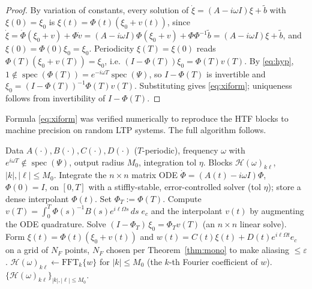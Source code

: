 \documentclass{amsart}
\theoremstyle{definition}
\DeclareMathOperator{\spec}{spec}
\newcommand{\Hcal}{\mathcal{H}}
\begin{document}
\begin{proof}
By variation of constants, every solution of $\dot\xi=(A-i\omega I)\xi+\tilde b$
with $\xi(0)=\xi_0$ is $\xi(t)=\Phi(t)(\xi_0+v(t))$, since
$\dot\xi=\dot\Phi(\xi_0+v)+\Phi\dot v
=(A-i\omega I)\Phi(\xi_0+v)+\Phi\Phi^{-1}\tilde b=(A-i\omega I)\xi+\tilde b$, and
$\xi(0)=\Phi(0)\xi_0=\xi_0$. Periodicity $\xi(T)=\xi(0)$ reads
$\Phi(T)(\xi_0+v(T))=\xi_0$, i.e. $(I-\Phi(T))\xi_0=\Phi(T)v(T)$. By
\eqref{eq:hyp}, $1\notin\spec(\Phi(T))=e^{-i\omega T}\spec(\Psi)$, so $I-\Phi(T)$
is invertible and $\xi_0=(I-\Phi(T))^{-1}\Phi(T)v(T)$. Substituting gives
\eqref{eq:xiform}; uniqueness follows from invertibility of $I-\Phi(T)$.
\end{proof}

Formula \eqref{eq:xiform} was verified numerically to reproduce the HTF blocks
to machine precision on random LTP systems. The full algorithm follows.

\begin{algorithm}[H]
\caption{Monodromy/Floquet HTF at a single frequency $\omega$}\label{alg:mono}
\begin{algorithmic}[1]
\Require Data $A(\cdot),B(\cdot),C(\cdot),D(\cdot)$ ($T$-periodic), frequency $\omega$
with $e^{i\omega T}\notin\spec(\Psi)$, output radius $M_0$, integration tol $\eta$.
\Ensure Blocks $\Hcal(\omega)_{k\ell}$, $|k|,|\ell|\le M_0$.
\State Integrate the $n\times n$ matrix ODE $\dot\Phi=(A(t)-i\omega I)\Phi$,
$\Phi(0)=I$, on $[0,T]$ with a stiffly-stable, error-controlled solver (tol
$\eta$); store a dense interpolant $\Phi(t)$. Set $\Phi_T:=\Phi(T)$.
  \State Compute $v(T)=\int_0^T\Phi(s)^{-1}B(s)e^{i\ell\Omega s}\,ds\;e_c$ and the
  interpolant $v(t)$ by augmenting the ODE quadrature.
  \State Solve $(I-\Phi_T)\,\xi_0=\Phi_T v(T)$ (an $n\times n$ linear solve).
  \State Form $\xi(t)=\Phi(t)(\xi_0+v(t))$ and
  $w(t)=C(t)\xi(t)+D(t)e^{i\ell\Omega t}e_c$ on a grid of $N_F$ points,
  $N_F$ chosen per Theorem~\ref{thm:mono} to make aliasing $\le\varepsilon$.
  \State $\Hcal(\omega)_{k\ell}\gets \mathrm{FFT}_k\{w\}$ for $|k|\le M_0$
  (the $k$-th Fourier coefficient of $w$).
\EndFor
\State \Return $\{\Hcal(\omega)_{k\ell}\}_{|k|,|\ell|\le M_0}$.
\end{algorithmic}
\end{algorithm}
\end{document}

